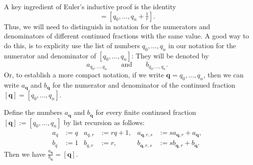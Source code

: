 A key ingredient of Euler's inductive proof is the identity
\begin{equation*}
  [q_0,\ldots,q_n,r]=[q_0,\ldots,q_n+\tfrac{1}{r}].
\end{equation*}
Thus, we will need to distinguish in notation for the numerators and denominators of different continued fractions with the same value. A good way to do this, is to explicity use the list of numbers $q_0,\ldots,q_n$ in our notation for the numerator and denominator of $[q_0,\ldots,q_n]$: They will be denoted by
\begin{equation*}
  a_{q_0,\ldots,q_n}\qquad\text{and}\qquad b_{q_0,\ldots,q_n}.
\end{equation*}
Or, to establish a more compact notation, if we write $\symbf{q}=q_0,\ldots,q_n$, then we can write $a_{\symbf{q}}$ and $b_{\symbf{q}}$ for the numerator and denominator of the continued fraction $[\symbf{q}]=[q_0,\ldots,q_n]$.

\begin{theorem}\label{theorem:recurrence-theorem-convergents}
  Define the numbers $a_{\symbf{q}}$ and $b_{\symbf{q}}$ for every finite continued fraction $[\symbf{q}]:=[q_0,\ldots,q_n]$ by list recursion as follows:
  \begin{align*}
    a_q & := q & a_{q,r} & := rq + 1, & a_{\symbf{q},r,s} & := sa_{\symbf{q},r}+a_{\symbf{q}}, \\
    b_{q} & := 1 & b_{q,r} & := r, & b_{\symbf{q},r,s} & := sb_{\symbf{q},r}+b_{\symbf{q}}.
  \end{align*}
  Then we have $\frac{a_{\symbf{q}}}{b_{\symbf{q}}}=[\symbf{q}]$.
\end{theorem}

